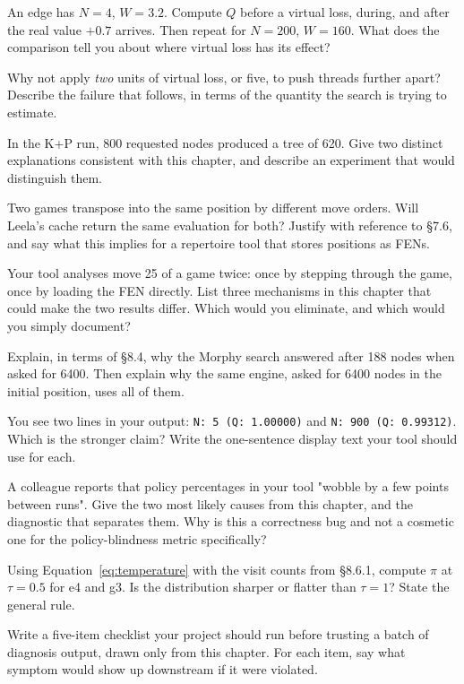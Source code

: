 \begin{exercises}

 An edge has $N = 4$, $W = 3.2$. Compute $Q$ before a virtual
loss, during, and after the real value $+0.7$ arrives. Then repeat for $N = 200$,
$W = 160$. What does the comparison tell you about where virtual loss has its effect?

 Why not apply \emph{two} units of virtual loss, or five, to
push threads further apart? Describe the failure that follows, in terms of the quantity the
search is trying to estimate.

 In the K+P run, 800 requested nodes produced a tree of
620. Give two distinct explanations consistent with this chapter, and describe an experiment
that would distinguish them.

 Two games transpose into the same position by different
move orders. Will Leela's cache return the same evaluation for both? Justify with reference
to §7.6, and say what this implies for a repertoire tool that stores positions as FENs.

 Your tool analyses move 25 of a game twice: once by stepping
through the game, once by loading the FEN directly. List three mechanisms in this chapter
that could make the two results differ. Which would you eliminate, and which would you simply
document?

 Explain, in terms of §8.4, why the Morphy search answered
after 188 nodes when asked for 6400. Then explain why the same engine, asked for 6400 nodes
in the initial position, uses all of them.

 You see two lines in your output:
\texttt{N: 5 (Q: 1.00000)} and \texttt{N: 900 (Q: 0.99312)}. Which is the stronger claim?
Write the one-sentence display text your tool should use for each.

 A colleague reports that policy percentages in your tool "wobble by
a few points between runs". Give the two most likely causes from this chapter, and the
diagnostic that separates them. Why is this a correctness bug and not a cosmetic one for the
policy-blindness metric specifically?

 Using Equation~\eqref{eq:temperature} with the visit counts
from §8.6.1, compute $\pi$ at $\tau = 0.5$ for e4 and g3. Is the distribution sharper or
flatter than $\tau = 1$? State the general rule.

 Write a five-item checklist your project should run before
trusting a batch of diagnosis output, drawn only from this chapter. For each item, say what
symptom would show up downstream if it were violated.

\end{exercises}
